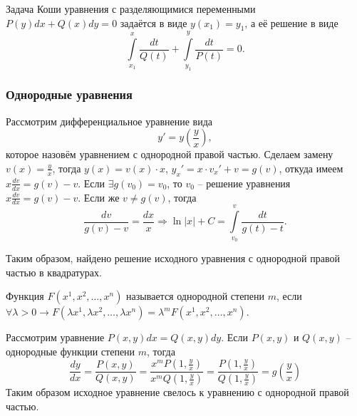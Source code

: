     \begin{proposition}
        Задача Коши уравнения с разделяющимися переменными $P(y)dx + Q(x)dy = 0$ задаётся в виде $y(x_1) = y_1$, а её решение в виде 
        \begin{equation*}
            \int\limits_{x_1}^{x} \frac{dt}{Q(t)} + \int\limits_{y_1}^{y} \frac{dt}{P(t)} = 0.
        \end{equation*}
    \end{proposition}

    \subsubsection{Однородные уравнения}

    Рассмотрим дифференциальное уравнение вида
    \[ y' = y \left( \frac{y}{x} \right), \]
    которое назовём уравнением с однородной правой частью. Сделаем замену $v(x) = \frac{y}{x}$, тогда $y(x) = v(x) \cdot x$, $y_x' = x \cdot v_x' + v = g(v)$, откуда имеем $x \frac{dv}{dx} = g(v) - v$. Если $\exists g(v_0) = v_0$, то $v_0$ -- решение уравнения $x \frac{dv}{dx} = g(v) - v$. Если же $v \neq g(v)$, тогда
    \begin{equation*}
        \frac{dv}{g(v) - v} = \frac{dx}{x} \Rightarrow \ln |x| + C = \int\limits_{v_0}^{v} \frac{dt}{g(t) - t}.
    \end{equation*}

    Таким образом, найдено решение исходного уравнения с однородной правой частью в квадратурах.

    \begin{definition}
        Функция $F(x^1, x^2, \dots, x^n)$ называется однородной степени $m$, если $\forall \lambda > 0 \longrightarrow F(\lambda x^1, \lambda x^2, \dots,  \lambda x^n) = \lambda^m F(x^1, x^2, \dots, x^n)$.
    \end{definition}

    \begin{example}
        Рассмотрим уравнение $P(x, y) dx = Q(x, y) dy$. Если $P(x, y)$ и $Q(x, y)$ -- однородные функции степени $m$, тогда
        \begin{equation*}
            \frac{dy}{dx} = \frac{P(x, y)}{Q(x, y)} = \frac{x^m P(1, \frac{y}{x})}{x^m Q(1, \frac{y}{x})} = \frac{P(1, \frac{y}{x})}{Q(1, \frac{y}{x})} = g \left( \frac{y}{x} \right)
        \end{equation*}
        Таким образом исходное уравнение свелось к уравнению с однородной правой частью.
    \end{example}

